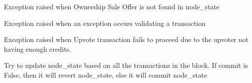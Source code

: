 \documentclass[letterpaper,10pt,english]{sphinxmanual}
\begin{document}

\begin{fulllineitems}
\label{\detokenize{index:validation.OwnershipSaleOfferNotFoundException}}
Exception raised when Ownership Sale Offer is not found in node\_state

\end{fulllineitems}


\begin{fulllineitems}
\label{\detokenize{index:validation.TransactionException}}
Exception raised when an exception occurs validating a transaction

\end{fulllineitems}


\begin{fulllineitems}
\label{\detokenize{index:validation.UpvoteFailedNoCreditsException}}
Exception raised when Upvote transaction fails to proceed due to
the upvoter not having enough credits.

\end{fulllineitems}


\begin{fulllineitems}
\label{\detokenize{index:validation.apply_block}}
Try to update node\_state based on all the transactions in the
block.  If commit is False, then it will revert node\_state, else
it will commit node\_state

\end{fulllineitems}
\end{document}
